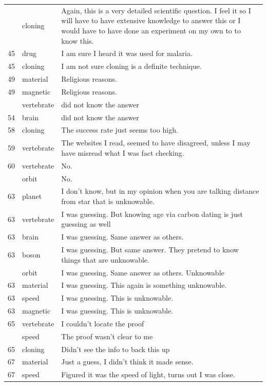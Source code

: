 \documentclass[
  doc,floatsintext]{apa6}
\begin{document}
\begin{longtable}[t]{>{}r>{}l>{\raggedright\arraybackslash}p{30em}}
\addlinespace
44 & cloning & Again, this is a very detailed scientific question. I feel it so I will have to have extensive knowledge to answer this or I would have to have done an experiment on my own to to know this.\\
45 & drug & I am sure I heard it was used for malaria.\\
45 & cloning & I am not sure cloning is a definite technique.\\
49 & material & Religious reasons.\\
49 & magnetic & Religious reasons.\\
\addlinespace
54 & vertebrate & did not know the answer\\
54 & brain & did not know the answer\\
58 & cloning & The success rate just seems too high.\\
59 & vertebrate & The websites I read, seemed to have disagreed, unless I may have misread what I was fact checking.\\
60 & vertebrate & No.\\
\addlinespace
60 & orbit & No.\\
63 & planet & I don't know, but in my opinion when you are talking distance from star that is unknowable.\\
63 & vertebrate & I was guessing.  But knowing age via carbon dating is just guessing as well\\
63 & brain & I was guessing.  Same answer as others.\\
63 & boson & I was guessing.  But same answer.  They pretend to know things that are unknowable.\\
\addlinespace
63 & orbit & I was guessing.  Same answer as others.  Unknowable\\
63 & material & I was guessing.  This again is something unknowable.\\
63 & speed & I was guessing.  This is unknowable.\\
63 & magnetic & I was guessing.  This is unknowable.\\
65 & vertebrate & I couldn’t locate the proof\\
\addlinespace
65 & speed & The proof wasn’t clear to me\\
65 & cloning & Didn’t see the info to back this up\\
67 & material & Just a guess, I didn't think it made sense.\\
67 & speed & Figured it was the speed of light, turns out I was close.\\

\end{longtable}
\end{document}
